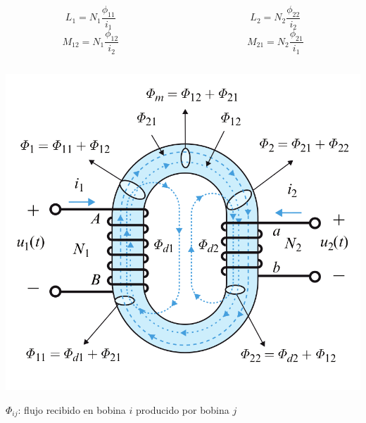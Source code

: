 \documentclass[xcolor={usenames,svgnames,dvipsnames}]{beamer}
\begin{document}
\begin{frame}[label={sec:org79aea4b},plain]{}
\begin{columns}
\begin{column}{0.5\columnwidth}
\[
  L_1 = N_1 \frac{\phi_{11}}{i_1}
\]
\[
  M_{12} = N_1 \frac{\phi_{12}}{i_2}
\]
\end{column}
\begin{column}{0.5\columnwidth}
\[
  L_2 = N_2 \frac{\phi_{22}}{i_2}
\]
\[
  M_{21} = N_2 \frac{\phi_{21}}{i_1}
\]
\end{column}
\end{columns}

\begin{center}
\includegraphics[height=0.65\textheight]{figs/Acoplamiento1.png}
\end{center}

\begin{center}
\(\Phi_{ij}\): flujo recibido en bobina \(i\) producido por bobina \(j\)
\end{center}
\end{frame}
\end{document}
